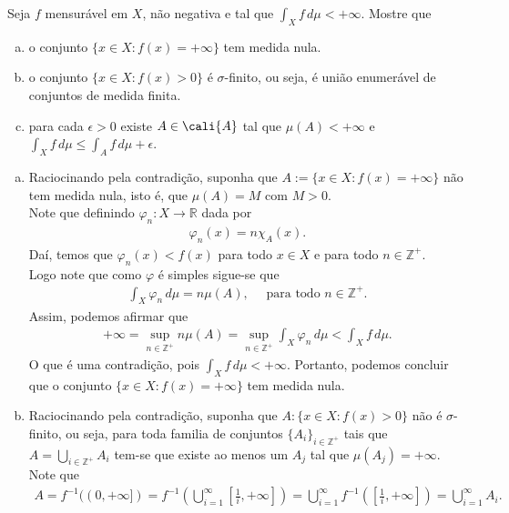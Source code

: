 \begin{homeworkProblem}[1]
  Seja $f$ mensurável em $X$, não negativa e tal que $\int_{X}f\,d\mu<+\infty$. Mostre que
  \begin{enumerate}[a)]
    \item o conjunto $\{x\in X: f(x)=+\infty\}$ tem medida nula.
    \item o conjunto $\{x\in X: f(x)>0\}$ é $\sigma$-finito, ou seja, é união enumerável de conjuntos de medida finita.
    \item para cada $\epsilon>0$ existe $A\in\cali{A}$ tal que $\mu(A)<+\infty$ e $\int_{X}f\,d\mu\leq \int_{A}f\,d\mu +\epsilon$. 
  \end{enumerate}
  \begin{solution}
  \begin{enumerate}[a)]
    \item Raciocinando pela contradição, suponha que $A:=\{x\in X:f(x)=+\infty\}$ não tem medida nula, isto é, que $\mu(A)=M$ com $M>0$.\\
      Note que definindo $\varphi_n:X\to\mathbb{R}$ dada por
      \begin{align*}
        \varphi_n(x)=n\chi_{A}(x).
      \end{align*}
      Daí, temos que $\varphi_n(x)< f(x)$ para todo $x\in X$ e para todo $n\in\mathbb{Z}^{+}$.\\
      Logo note que como $\varphi$ é simples sigue-se que 
      \begin{align*}
        \int_{X}\varphi_n\,d\mu= n\mu(A),\quad\text{ para todo }n\in\mathbb{Z}^{+}. 
      \end{align*}
      Assim, podemos afirmar que
      \begin{align*}
        +\infty=\sup_{n\in\mathbb{Z}^{+}}n\mu(A)=\sup_{n\in\mathbb{Z}^{+}}\int_{X}\varphi_n\,d\mu<\int_{X}f\,d\mu.
      \end{align*}
      O que é uma contradição, pois $\int_{X}f\,d\mu<+\infty$. Portanto, podemos concluir que o conjunto $\{x\in X:f(x)=+\infty\}$ tem medida nula.
    \item Raciocinando pela contradição, suponha que $A:\{x\in X:f(x)>0\}$ não é $\sigma$-finito, ou seja, para toda familia de conjuntos $\{A_i\}_{i\in\mathbb{Z}^{+}}$ tais que $A=\bigcup_{i\in\mathbb{Z}^{+}}A_i$ tem-se que existe ao menos um $A_j$ tal que $\mu(A_j)=+\infty$.\\
      Note que
      \begin{align*}
        A=f^{-1}((0,+\infty])=f^{-1}\left( \bigcup_{i=1}^{\infty}\left[ \frac{1}{i},+\infty \right] \right)=\bigcup_{i=1}^{\infty}f^{-1}\left( \left[ \frac{1}{i},+\infty \right] \right)=\bigcup_{i=1}^{\infty}A_i.

\end{align*}
\end{enumerate}
\end{solution}
\end{homeworkProblem}
